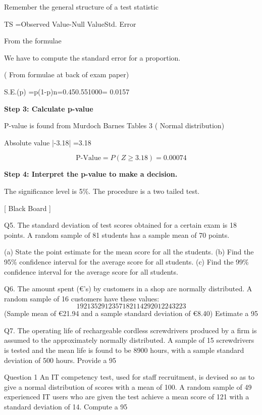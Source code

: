 \documentclass[]{report}
\begin{document}
Remember the general structure of a test statistic

TS =Observed Value-Null ValueStd. Error 



From the formulae

We have to compute the standard error for a proportion. 

( From formulae at back of exam paper)

S.E.(p) =p(1-p)n=0.450.551000= 0.0157




\noindent \textbf{Step 3: Calculate p-value}

P-value is found from Murdoch Barnes Tables 3 ( Normal distribution)

Absolute value  |-3.18| =3.18




\[ \mbox{P-Value} = P(Z \geq 3.18) = 0.00074\]


\noindent \textbf{Step 4: Interpret the p-value to make a decision.}

The significance level is 5\%.  The procedure is a two tailed test.


[ Black Board ]

\newpage
Q5. The standard deviation of test scores obtained for a certain exam is 18 points. 
A random sample of 81 students has a sample mean of 70 points.

(a) State the point estimate for the mean score for all the students.
(b) Find the 95\% confidence interval for the average score for all students.
(c) Find the 99\% confidence interval for the average score for all students.

Q6. The amount spent (€’s) by customers in a shop are normally distributed. 
A random sample of 16 customers have these values:
\[19 21 35 29 12 35 7 18 21 14 29 20 12 24 32 23\]
(Sample  mean of €21.94 and a sample standard deviation of €8.40) 
Estimate a 95%

Q7. The operating life of rechargeable cordless screwdrivers produced by a firm is assumed to 
the approximately normally distributed. A sample of 15 screwdrivers is tested and the mean 
life is found to be 8900 hours, with a sample standard deviation of 500 hours. 
Provide a 95%


Question 1 
An IT competency test, used for staff recruitment, is devised so as to give a normal distribution of scores with a mean of 100. A random sample of 49 experienced IT users who are given the test achieve a mean score of 121 with a standard deviation of 14. 
Compute a 95%
\end{document}
